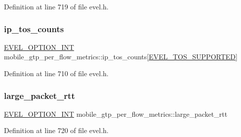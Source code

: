 Definition at line 719 of file evel.\+h.

\hypertarget{structmobile__gtp__per__flow__metrics_aa36e26fcf56114f6113100b8b8e27cd2}{}\label{structmobile__gtp__per__flow__metrics_aa36e26fcf56114f6113100b8b8e27cd2} 
\subsubsection{\texorpdfstring{ip\+\_\+tos\+\_\+counts}{ip\_tos\_counts}}
{\footnotesize\ttfamily \hyperlink{evel_8h_a452d825778d1c2368a54b8f689a25ba7}{E\+V\+E\+L\+\_\+\+O\+P\+T\+I\+O\+N\+\_\+\+I\+NT} mobile\+\_\+gtp\+\_\+per\+\_\+flow\+\_\+metrics\+::ip\+\_\+tos\+\_\+counts\mbox{[}\hyperlink{evel_8h_a885e47485d9e2ab74f567c8b7b3e8043}{E\+V\+E\+L\+\_\+\+T\+O\+S\+\_\+\+S\+U\+P\+P\+O\+R\+T\+ED}\mbox{]}}



Definition at line 710 of file evel.\+h.

\hypertarget{structmobile__gtp__per__flow__metrics_a01a860c4af596cc941b0ce9ac1464f37}{}\label{structmobile__gtp__per__flow__metrics_a01a860c4af596cc941b0ce9ac1464f37} 
\subsubsection{\texorpdfstring{large\+\_\+packet\+\_\+rtt}{large\_packet\_rtt}}
{\footnotesize\ttfamily \hyperlink{evel_8h_a452d825778d1c2368a54b8f689a25ba7}{E\+V\+E\+L\+\_\+\+O\+P\+T\+I\+O\+N\+\_\+\+I\+NT} mobile\+\_\+gtp\+\_\+per\+\_\+flow\+\_\+metrics\+::large\+\_\+packet\+\_\+rtt}



Definition at line 720 of file evel.\+h.

\hypertarget{structmobile__gtp__per__flow__metrics_a1e3e6f6b328aad19fdab33e1cc179b1a}{}\label{structmobile__gtp__per__flow__metrics_a1e3e6f6b328aad19fdab33e1cc179b1a} 
